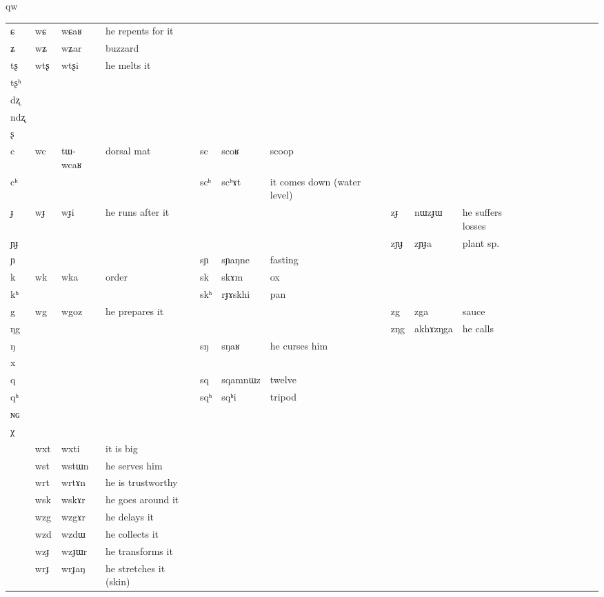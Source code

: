 qw\documentclass[oldfontcommands,oneside,a4paper,11pt]{article}
\newcommand{\ipa}[1]{{\phon #1}} %
\newcommand{\tib}[1]{\cellcolor{lightgray}\textbf{#1}}
\begin{document}
\begin{table}
{\begin{tabular}{l|lll|lll|lll|lllllll}
\ipa{ɕ}  &	\ipa{wɕ}  &	\ipa{wɕaʁ}  &he repents for it&	  &	  &	&	  &	  &	&	\\
\ipa{ʑ}  &	\ipa{wʑ}  &	\ipa{wʑar }  &	buzzard&	  &	  &	&	  &	  &	&	\\
\ipa{tʂ}  &	\ipa{wtʂ}  &	\ipa{wtʂi}  & he melts it	&	  &	  &	&	  &	  &	&	\\
\ipa{tʂʰ}  &	  &	  &	&	  &	  &	&	  &	  &	&	\\
\ipa{dʐ}  &	  &	  &	&	  &	  &	&	  &	  &	&	\\
\ipa{ndʐ}  &	  &	  &	&	  &	  &	&	  &	  &	&	\\
\ipa{ʂ}  &	  &	  &	&	  &	  &	&	  &	  &	&	\\
\ipa{c}  &	\ipa{wc}  &	\ipa{tɯ-wcaʁ }  &dorsal mat	&	\ipa{sc}  &	\ipa{scoʁ}  &scoop	&	  &	  &	&	\\
\ipa{cʰ}  &	  &	  &	&	\ipa{scʰ}  &	\ipa{scʰɤt}  &	it comes down (water level)&	  &	  &	&	\\
\ipa{ɟ}  &	\ipa{wɟ}  &	\ipa{wɟi}  &he runs after it	&	  &	  &	&	\ipa{zɟ}  &	\ipa{nɯzɟɯ}  &	he suffers losses&	\\
\ipa{ɲɟ}  &	  &	  &	&	  &	  &	&	\ipa{zɲɟ}  &	\ipa{zɲɟa}  &	plant sp.&	\\
\ipa{ɲ}  &	  &	  &	&	\ipa{sɲ}  &	\ipa{sɲaŋne}  &fasting	&	   &	 &	&	\\
\ipa{k}  &	\ipa{wk}  &	\ipa{wka}  &	order&	\ipa{sk}  &	\ipa{skɤm}  &	ox&	  &	  &	&	\\
\ipa{kʰ}  &	  &	  &	&	\ipa{skʰ}  &	\ipa{rɟɤskhi}  &pan	&	  &	  &	&	\\
\ipa{g}  &	\ipa{wg}  \tib{}&	\ipa{wgoz}  &	he prepares it&	  &	  &	& 	\ipa{zg}  &	\ipa{zga}  &	sauce&	\\
\ipa{ŋg}  &	  &	  &	&	  &	  &	&	\ipa{zŋg}  &	\ipa{akhɤzŋga}  &	he calls&	\\
\ipa{ŋ}  &	  &	  &	&	\ipa{sŋ}  &	\ipa{sŋaʁ}  &	he curses him&	  &	  &	&	\\
\ipa{x}  &	  &	  &	&	  &	  &	&	  &	  &	&	\\
\ipa{q}  &	  &	  &	&	\ipa{sq}  &	\ipa{sqamnɯz}  &	twelve&	  &	  &	&	\\
\ipa{qʰ}  &	  &	  &	&	\ipa{sqʰ}  &	\ipa{sqʰi}  &	tripod&	  &	  &	&	\\
\ipa{ɴɢ}  &	  &	  &	&	  &	  &	&	  &	  &	&	\\
\ipa{χ}  &	  &	  &	&	  &	  &	&	  &	  &	&	\\
\midrule
&	\ipa{wxt}  &	\ipa{wxti}  &it is big	\\
&	\ipa{wst} \tib{} &	\ipa{wstɯn}  &he serves him	\\
&	\ipa{wrt}  \tib{} &	\ipa{wrtɤn}  &	he is trustworthy\\
&	\ipa{wsk}  \tib{} &	\ipa{wskɤr}  & he goes around it	\\
&	\ipa{wzg}  \tib{} &	\ipa{wzgɤr}  & he delays it	\\
&	\ipa{wzd}  \tib{} &	\ipa{wzdɯ}  & he collects it	\\
&	\ipa{wzɟ}  \tib{} &	\ipa{wzɟɯr}  & he transforms it	\\
&	\ipa{wrɟ}  \tib{} &	\ipa{wrɟaŋ}  &he stretches it (skin)	\\
\bottomrule
\end{tabular}} 
\end{table}
 
\end{document}
